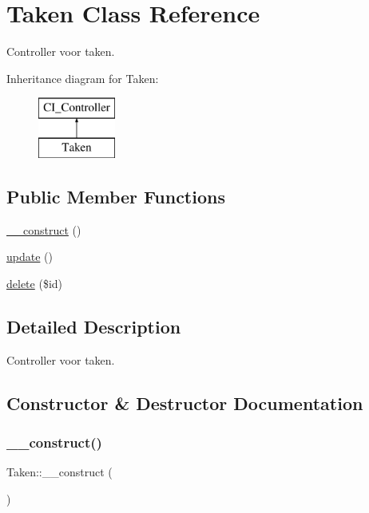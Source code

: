 \hypertarget{class_taken}{}\section{Taken Class Reference}
\label{class_taken}


Controller voor taken.  


Inheritance diagram for Taken\+:\begin{figure}[H]
\begin{center}
\leavevmode
\includegraphics[height=2.000000cm]{class_taken}
\end{center}
\end{figure}
\subsection*{Public Member Functions}
\begin{DoxyCompactItemize}
\item 
\mbox{\hyperlink{class_taken_aed7046ad0bd4a755417ca55cb1621b8e}{\+\_\+\+\_\+construct}} ()
\item 
\mbox{\hyperlink{class_taken_a2c370b12ed83ff4617224675576b47a1}{update}} ()
\item 
\mbox{\hyperlink{class_taken_a696d6a2a1c533a261e2f0e29a4537662}{delete}} (\$id)
\end{DoxyCompactItemize}


\subsection{Detailed Description}
Controller voor taken. 

\subsection{Constructor \& Destructor Documentation}
\mbox{\label{class_taken_aed7046ad0bd4a755417ca55cb1621b8e}} 
\subsubsection{\texorpdfstring{\+\_\+\+\_\+construct()}{\_\_construct()}}
{\footnotesize\ttfamily Taken\+::\+\_\+\+\_\+construct (\begin{DoxyParamCaption}{ }\end{DoxyParamCaption})}

